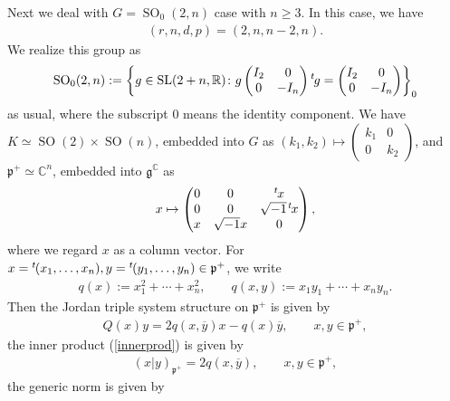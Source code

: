 \documentclass[pdftex]{sigma}
\numberwithin{equation}{section}
\newcommand{\BR}{\mathbb{R}}
\newcommand{\BC}{\mathbb{C}}
\newcommand{\fg}{\mathfrak{g}}
\newcommand{\fp}{\mathfrak{p}}
\begin{document}
Next we deal with $G=\operatorname{SO}_0(2,n)$ case with $n\ge 3$. In this case, we have
\begin{gather*} (r,n,d,p)=(2,n,n-2,n). \end{gather*}
We realize this group as
\begin{gather*} \operatorname{SO}_0(2,n):=\left\{ g\in {\rm SL}(2+n,\BR)\colon g\begin{pmatrix}I_2&0\\0&-I_n\end{pmatrix}{}^t\hspace{-1pt}g=\begin{pmatrix}I_2&0\\0&-I_n\end{pmatrix}
\right\}_0 \end{gather*}
as usual, where the subscript 0 means the identity component.
We have $K\simeq \operatorname{SO}(2)\times \operatorname{SO}(n)$, embedded into $G$ as $(k_1,k_2)\mapsto \left(\begin{smallmatrix}k_1&0\\0&k_2\end{smallmatrix}\right)$,
and $\fp^+\simeq\BC^n$, embedded into $\fg^\BC$ as
\begin{gather*} x\mapsto \begin{pmatrix}0&0&{}^t\hspace{-1pt}x\\0&0&\sqrt{-1}\hspace{1pt}{}^t\hspace{-1pt}x\\x&\sqrt{-1}x&0\end{pmatrix}, \end{gather*}
where we regard $x$ as a column vector. For $x={}^t\hspace{-1pt}(x_1,\ldots,x_n),y={}^t\hspace{-1pt}(y_1,\ldots,y_n)\in\fp^+$, we write
\begin{gather}\label{quadra}
q(x):=x_1^2+\cdots+x_n^2,\qquad q(x,y):=x_1y_1+\cdots+x_ny_n.
\end{gather}
Then the Jordan triple system structure on $\fp^+$ is given by
\begin{gather*} Q(x)y=2q(x,\overline{y})x-q(x)\overline{y}, \qquad x,y\in\fp^+, \end{gather*}
the inner product (\ref{innerprod}) is given by
\begin{gather*} (x|y)_{\fp^+}=2q(x,\overline{y}), \qquad x,y\in\fp^+, \end{gather*}
the generic norm is given by
\end{document}
